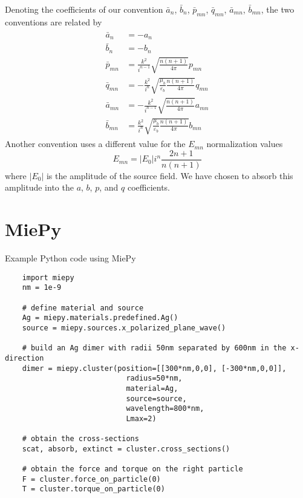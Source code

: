 \documentclass[11pt]{article}
\begin{document}
Denoting the coefficients of our convention $\bar a_n$, $\bar b_n$, $\bar p_{mn}$, $\bar q_{mn}$, $\bar a_{mn}$, $\bar b_{mn}$, the two conventions are related by
\begin{align}
\begin{split}
    \bar a_{n} &= - a_{n} \\
    \bar b_{n} &= - b_{n} \\
    \bar p_{mn} &= \frac{k^2}{i^{n-1}}\sqrt{\frac{n(n+1)}{4\pi}} p_{mn} \\
    \bar q_{mn} &= -\frac{k^2}{i^n}\sqrt{\frac{\mu_b}{\varepsilon_b} \frac{n(n+1)}{4\pi}} q_{mn} \\
    \bar a_{mn} &= -\frac{k^2}{i^{n-1}}\sqrt{\frac{n(n+1)}{4\pi}} a_{mn} \\
    \bar b_{mn} &= \frac{k^2}{i^n}\sqrt{\frac{\mu_b}{\varepsilon_b} \frac{n(n+1)}{4\pi}} b_{mn}
\end{split}
\end{align}
Another convention uses a different value for the $E_{mn}$ normalization values \cite{xu1995electromagnetic}
\begin{equation}
    E_{mn} = |E_0|i^n \frac{2n+1}{n(n+1)}
\end{equation}
where $|E_0|$ is the amplitude of the source field.
We have chosen to absorb this amplitude into the $a$, $b$, $p$, and $q$ coefficients.

\section{MiePy}

Example Python code using MiePy
\begin{lstlisting}
    import miepy
    nm = 1e-9

    # define material and source
    Ag = miepy.materials.predefined.Ag()
    source = miepy.sources.x_polarized_plane_wave()

    # build an Ag dimer with radii 50nm separated by 600nm in the x-direction
    dimer = miepy.cluster(position=[[300*nm,0,0], [-300*nm,0,0]],
                            radius=50*nm,
                            material=Ag,
                            source=source,
                            wavelength=800*nm,
                            Lmax=2)

    # obtain the cross-sections
    scat, absorb, extinct = cluster.cross_sections()

    # obtain the force and torque on the right particle
    F = cluster.force_on_particle(0)
    T = cluster.torque_on_particle(0)
\end{lstlisting}



{}
\end{document}
